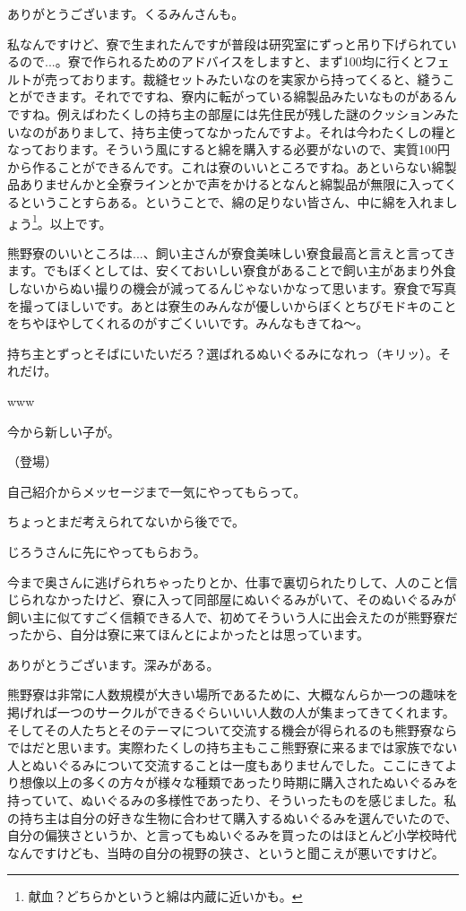 \documentclass[9pt,4aj]{jsarticle}
\begin{document}
\begin{multicols}{2}
ありがとうございます。くるみんさんも。

私なんですけど、寮で生まれたんですが普段は研究室にずっと吊り下げられているので...。寮で作られるためのアドバイスをしますと、まず100均に行くとフェルトが売っております。裁縫セットみたいなのを実家から持ってくると、縫うことができます。それでですね、寮内に転がっている綿製品みたいなものがあるんですね。例えばわたくしの持ち主の部屋には先住民が残した謎のクッションみたいなのがありまして、持ち主使ってなかったんですよ。それは今わたくしの糧となっております。そういう風にすると綿を購入する必要がないので、実質100円から作ることができるんです。これは寮のいいところですね。あといらない綿製品ありませんかと全寮ラインとかで声をかけるとなんと綿製品が無限に入ってくるということすらある。ということで、綿の足りない皆さん、中に綿を入れましょう\footnote{献血？どちらかというと綿は内蔵に近いかも。}。以上です。

熊野寮のいいところは...、飼い主さんが寮食美味しい寮食最高と言えと言ってきます。でもぼくとしては、安くておいしい寮食があることで飼い主があまり外食しないからぬい撮りの機会が減ってるんじゃないかなって思います。寮食で写真を撮ってほしいです。あとは寮生のみんなが優しいからぼくとちびモドキのことをちやほやしてくれるのがすごくいいです。みんなもきてね～。

持ち主とずっとそばにいたいだろ？選ばれるぬいぐるみになれっ（キリッ）。それだけ。

www

今から新しい子が。

（登場）

自己紹介からメッセージまで一気にやってもらって。

ちょっとまだ考えられてないから後でで。

じろうさんに先にやってもらおう。

今まで奥さんに逃げられちゃったりとか、仕事で裏切られたりして、人のこと信じられなかったけど、寮に入って同部屋にぬいぐるみがいて、そのぬいぐるみが飼い主に似てすごく信頼できる人で、初めてそういう人に出会えたのが熊野寮だったから、自分は寮に来てほんとによかったとは思っています。

ありがとうございます。深みがある。

熊野寮は非常に人数規模が大きい場所であるために、大概なんらか一つの趣味を掲げれば一つのサークルができるぐらいいい人数の人が集まってきてくれます。そしてその人たちとそのテーマについて交流する機会が得られるのも熊野寮ならではだと思います。実際わたくしの持ち主もここ熊野寮に来るまでは家族でない人とぬいぐるみについて交流することは一度もありませんでした。ここにきてより想像以上の多くの方々が様々な種類であったり時期に購入されたぬいぐるみを持っていて、ぬいぐるみの多様性であったり、そういったものを感じました。私の持ち主は自分の好きな生物に合わせて購入するぬいぐるみを選んでいたので、自分の偏狭さというか、と言ってもぬいぐるみを買ったのはほとんど小学校時代なんですけども、当時の自分の視野の狭さ、というと聞こえが悪いですけど。


\end{multicols}
\end{document}
